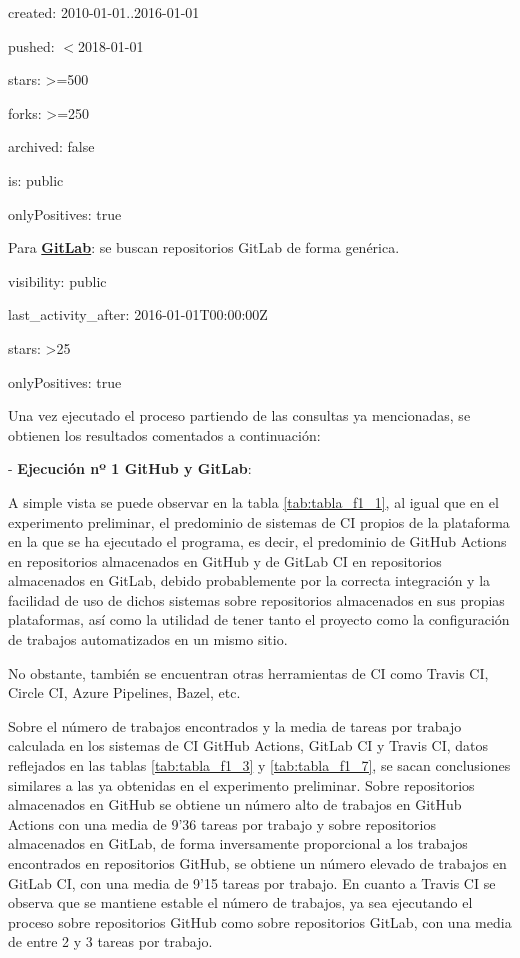 \begin{compactitem}
\begin{compactitem}
\begin{compactitem}
            \item created: 2010-01-01..2016-01-01
            \item pushed: $<$2018-01-01
            \item stars: \textgreater=500
            \item forks: \textgreater=250
            \item archived: false
            \item is: public
            \item onlyPositives: true
        \end{compactitem}
    \end{compactitem}
    \item Para \textbf{\underline{GitLab}}: se buscan repositorios GitLab de forma genérica.
    \begin{compactitem}
        \item visibility: public
        \item last\_activity\_after: 2016-01-01T00:00:00Z
        \item stars: \textgreater25
        \item onlyPositives: true
    \end{compactitem}
\end{compactitem}

Una vez ejecutado el proceso partiendo de las consultas ya mencionadas, se obtienen los resultados comentados a continuación:

- \textbf{Ejecución nº 1 GitHub y GitLab}: 

A simple vista se puede observar en la tabla \ref{tab:tabla_f1_1}, al igual que en el experimento preliminar, el predominio de sistemas de CI propios de la plataforma en la que se ha ejecutado el programa, es decir, el predominio de GitHub Actions en repositorios almacenados en GitHub y de GitLab CI en repositorios almacenados en GitLab, debido probablemente por la correcta integración y la facilidad de uso de dichos sistemas sobre repositorios almacenados en sus propias plataformas, así como la utilidad de tener tanto el proyecto como la configuración de trabajos automatizados en un mismo sitio.

No obstante, también se encuentran otras herramientas de CI como Travis CI, Circle CI, Azure Pipelines, Bazel, etc.

Sobre el número de trabajos encontrados y la media de tareas por trabajo calculada en los sistemas de CI GitHub Actions, GitLab CI y Travis CI, datos reflejados en las tablas \ref{tab:tabla_f1_3} y \ref{tab:tabla_f1_7}, se sacan conclusiones similares a las ya obtenidas en el experimento preliminar. Sobre repositorios almacenados en GitHub se obtiene un número alto de trabajos en GitHub Actions con una media de 9'36 tareas por trabajo y sobre repositorios almacenados en GitLab, de forma inversamente proporcional a los trabajos encontrados en repositorios GitHub, se obtiene un número elevado de trabajos en GitLab CI, con una media de 9'15 tareas por trabajo. En cuanto a Travis CI se observa que se mantiene estable el número de trabajos, ya sea ejecutando el proceso sobre repositorios GitHub como sobre repositorios GitLab, con una media de entre 2 y 3 tareas por trabajo.

